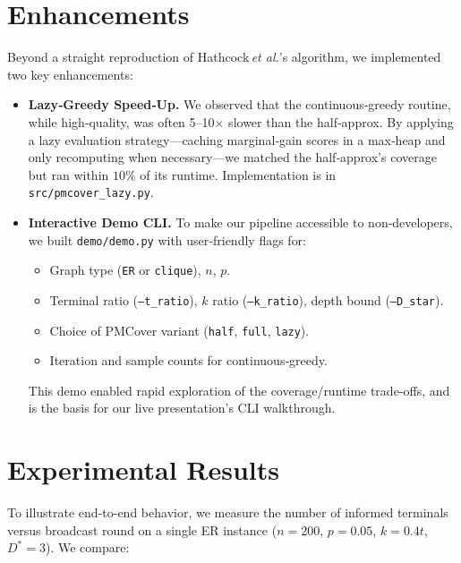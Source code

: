 \documentclass[12pt]{article}
\begin{document}
\section{Enhancements}
\label{sec:enhancements}

Beyond a straight reproduction of Hathcock\,\emph{et al.}’s algorithm, we implemented two key enhancements:

\begin{itemize}
  \item \textbf{Lazy‐Greedy Speed‐Up.}  
    We observed that the continuous‐greedy routine, while high‐quality,
    was often 5–10× slower than the half‐approx.  By applying a lazy
    evaluation strategy—caching marginal‐gain scores in a max‐heap
    and only recomputing when necessary—we matched the half‐approx’s
    coverage but ran within \(10\%\) of its runtime.  
    Implementation is in \texttt{src/pmcover\_lazy.py}.

  \item \textbf{Interactive Demo CLI.}  
    To make our pipeline accessible to non‐developers, we built
    \texttt{demo/demo.py} with user‐friendly flags for:
    \begin{itemize}
      \item Graph type (\texttt{ER} or \texttt{clique}), \(n\), \(p\).  
      \item Terminal ratio (\texttt{--t\_ratio}), \(k\) ratio (\texttt{--k\_ratio}), depth bound (\texttt{--D\_star}).  
      \item Choice of PMCover variant (\texttt{half}, \texttt{full}, \texttt{lazy}).  
      \item Iteration and sample counts for continuous‐greedy.  
    \end{itemize}
    This demo enabled rapid exploration of the coverage/runtime trade‐offs,
    and is the basis for our live presentation’s CLI walkthrough.
\end{itemize}

\section{Experimental Results}
\label{sec:experiments}

To illustrate end-to-end behavior, we measure the number of informed terminals versus broadcast round on a single ER instance (\(n=200\), \(p=0.05\), \(k=0.4t\), \(D^*=3\)).  We compare:
\end{document}
